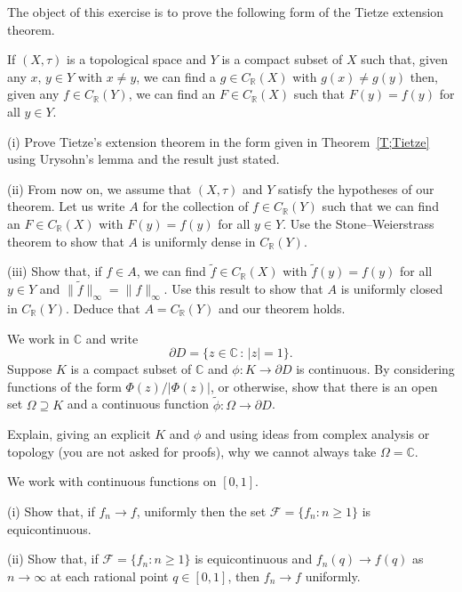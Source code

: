 \begin{exercise}\label{C2.8} The object of this exercise is to
prove the following form of the Tietze extension theorem.

If $(X,\tau)$ is a topological space and $Y$
is a compact subset of $X$ such that, given any
$x,\,y\in Y$ with $x\neq y$,
we can find a $g\in C_{\mathbb R}(X)$
with $g(x)\neq g(y)$ then,  given any $f\in C_{\mathbb R}(Y)$,
we can find
an $F\in C_{\mathbb R}(X)$ such that $F(y)=f(y)$ for all $y\in Y$.

(i) Prove Tietze's extension theorem in the form
given in Theorem~\ref{T;Tietze} using Urysohn's lemma
and the result just stated.

(ii) From now on, we assume that $(X,\tau)$ and $Y$
satisfy the hypotheses of our theorem. Let us write
$A$ for the collection of $f \in C_{\mathbb R}(Y)$
such that we can find
an $F\in C_{\mathbb R}(X)$ with $F(y)=f(y)$ for all $y\in Y$.
Use the Stone--Weierstrass theorem to show that $A$
is uniformly dense in $C_{\mathbb R}(Y)$.

(iii) Show that, if $f \in A$,
we can find $\tilde{f}\in C_{\mathbb R}(X)$
with $\tilde{f}(y)=f(y)$ for all $y\in Y$
and $\|\tilde{f}\|_{\infty}=\|f\|_{\infty}$.
Use this result to show that $A$ is uniformly
closed in $C_{\mathbb R}(Y)$. Deduce that
$A=C_{\mathbb R}(Y)$ and our theorem holds.
\end{exercise}
\begin{exercise}\label{C2.9} We work in ${\mathbb C}$ and write
\[\partial D=\{z\in {\mathbb C}\,:\,|z|=1\}.\]
Suppose $K$ is a compact subset of ${\mathbb C}$
and $\phi:K\rightarrow \partial D$ is continuous.
By considering functions of the form $\Phi(z)/|\Phi(z)|$,
or otherwise, show that there is an open set $\Omega\supseteq K$
and a continuous function $\tilde{\phi}:\Omega\rightarrow \partial D$.

Explain, giving an explicit $K$ and $\phi$ and 
using ideas from complex analysis or topology
(you are not asked for proofs), why we cannot always take
$\Omega={\mathbb C}$.
\end{exercise}
\begin{exercise}\label{C2.10} 
We work with continuous functions on $[0,1]$.

(i) Show that, if $f_{n}\rightarrow f$, uniformly then
the set ${\mathcal F}=\{f_{n}:n\geq 1\}$ is equicontinuous.

(ii) Show that, if ${\mathcal F}=\{f_{n}:n\geq 1\}$ is equicontinuous
and $f_{n}(q)\rightarrow f(q)$ as $n\rightarrow\infty$ at each rational
point $q\in [0,1]$, then $f_{n}\rightarrow f$ uniformly.
\end{exercise}
